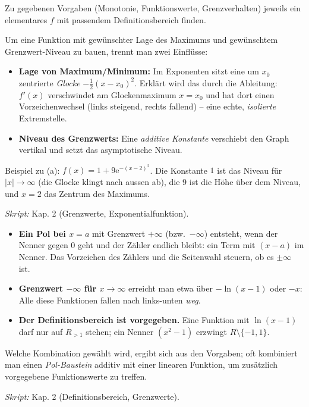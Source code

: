 

Zu gegebenen Vorgaben (Monotonie, Funktionswerte, Grenzverhalten) jeweils
ein elementares $f$ mit passendem Definitionsbereich finden.

\begin{werkzeugkasten}
Um eine Funktion mit gewünschter Lage des Maximums und gewünschtem
Grenzwert-Niveau zu bauen, trennt man zwei Einflüsse:
\begin{itemize}
  \item \textbf{Lage von Maximum/Minimum:} Im Exponenten sitzt eine um $x_0$
        zentrierte \emph{Glocke} $-\tfrac12(x-x_0)^2$. Erklärt wird das
        durch die Ableitung: $f'(x)$ verschwindet am Glockenmaximum $x=x_0$
        und hat dort einen Vorzeichenwechsel (links steigend, rechts
        fallend) -- eine echte, \emph{isolierte} Extremstelle.
  \item \textbf{Niveau des Grenzwerts:} Eine \emph{additive Konstante}
        verschiebt den Graph vertikal und setzt das asymptotische Niveau.
\end{itemize}
Beispiel zu (a): $f(x)=1+9\mathrm e^{-(x-2)^2}$. Die Konstante $1$ ist das
Niveau für $|x|\to\infty$ (die Glocke klingt nach aussen ab), die $9$
ist die Höhe über dem Niveau, und $x=2$ das Zentrum des Maximums.

\textit{Skript:} Kap. 2 (Grenzwerte, Exponentialfunktion).
\end{werkzeugkasten}

\begin{werkzeugkasten}
\begin{itemize}
  \item \textbf{Ein Pol bei $x=a$} mit Grenzwert $+\infty$ (bzw.\ $-\infty$)
        entsteht, wenn der Nenner gegen $0$ geht und der Zähler endlich
        bleibt: ein Term mit $(x-a)$ im Nenner. Das Vorzeichen des
        Zählers und die Seitenwahl steuern, ob es $\pm\infty$ ist.
  \item \textbf{Grenzwert $-\infty$ für $x\to\infty$} erreicht man etwa über
        $-\ln(x-1)$ oder $-x$: Alle diese Funktionen fallen nach links-unten
        \emph{weg}.
  \item \textbf{Der Definitionsbereich ist vorgegeben.} Eine Funktion mit
        $\ln(x-1)$ darf nur auf $R_{>1}$ stehen; ein Nenner $(x^2-1)$
        erzwingt $R\setminus\{-1,1\}$.
\end{itemize}
Welche Kombination gewählt wird, ergibt sich aus den Vorgaben; oft
kombiniert man einen \emph{Pol-Baustein} additiv mit einer linearen Funktion,
um zusätzlich vorgegebene Funktionswerte zu treffen.

\textit{Skript:} Kap. 2 (Definitionsbereich, Grenzwerte).
\end{werkzeugkasten}

